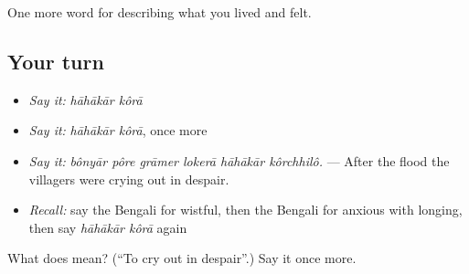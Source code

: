 \begin{grammarlens}[title={What you've built}]
One more word for describing what you lived and felt.
\end{grammarlens}

\subsection*{Your turn}
\begin{itemize}
\raggedright
  \item \emph{Say it:} \emph{hāhākār kôrā}
  \item \emph{Say it:} \emph{hāhākār kôrā}, once more
  \item \emph{Say it:} \emph{bônyār pôre grāmer lokerā hāhākār kôrchhilô.} — After the flood the villagers were crying out in despair.
  \item \emph{Recall:} say the Bengali for wistful, then the Bengali for anxious with longing, then say \emph{hāhākār kôrā} again
\end{itemize}

\begin{tcolorbox}[breakable,colback=teal!4,colframe=teal!35!black,title={Before you move on}]
What does   mean? (\textquotedblleft{}To cry out in despair\textquotedblright{}.) Say it once more.
\end{tcolorbox}
